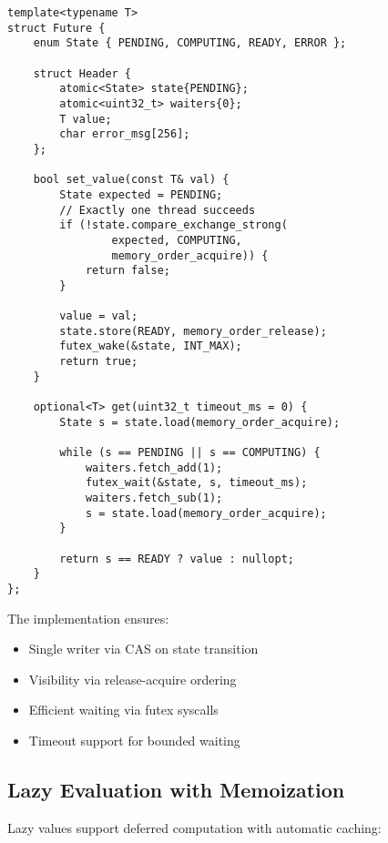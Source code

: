 \documentclass[sigconf,anonymous]{acmart}
\begin{document}
\begin{lstlisting}[caption={Future State Machine Implementation}]
template<typename T>
struct Future {
    enum State { PENDING, COMPUTING, READY, ERROR };
    
    struct Header {
        atomic<State> state{PENDING};
        atomic<uint32_t> waiters{0};
        T value;
        char error_msg[256];
    };
    
    bool set_value(const T& val) {
        State expected = PENDING;
        // Exactly one thread succeeds
        if (!state.compare_exchange_strong(
                expected, COMPUTING,
                memory_order_acquire)) {
            return false;
        }
        
        value = val;
        state.store(READY, memory_order_release);
        futex_wake(&state, INT_MAX);
        return true;
    }
    
    optional<T> get(uint32_t timeout_ms = 0) {
        State s = state.load(memory_order_acquire);
        
        while (s == PENDING || s == COMPUTING) {
            waiters.fetch_add(1);
            futex_wait(&state, s, timeout_ms);
            waiters.fetch_sub(1);
            s = state.load(memory_order_acquire);
        }
        
        return s == READY ? value : nullopt;
    }
};
\end{lstlisting}

The implementation ensures:
\begin{itemize}
\item Single writer via CAS on state transition
\item Visibility via release-acquire ordering
\item Efficient waiting via futex syscalls
\item Timeout support for bounded waiting
\end{itemize}

\subsection{Lazy Evaluation with Memoization}

Lazy values support deferred computation with automatic caching:
\end{document}
